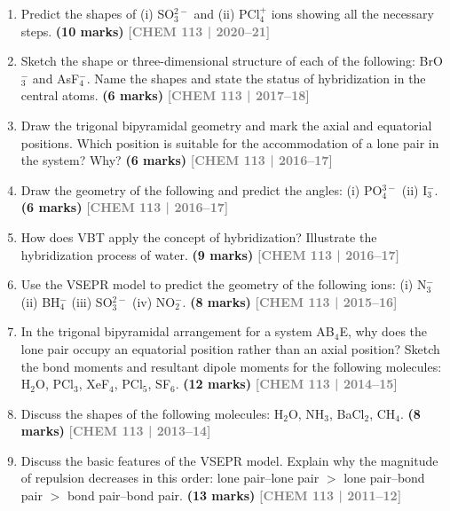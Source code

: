 \documentclass[12pt,a3paper]{article}
\newcommand{\yr}[1]{\hfill\textcolor{gray}{\small\textbf{[#1]}}}
\newcommand{\mk}[1]{\textcolor{orange!70!black}{\small\textbf{(#1 marks)}}}
\begin{document}
\begin{enumerate}
\item Predict the shapes of (i) SO$_3^{2-}$ and (ii) PCl$_4^+$ ions showing all the necessary steps. \mk{10}
\yr{CHEM 113 | 2020--21}



\item Sketch the shape or three-dimensional structure of each of the following: BrO$_3^-$ and AsF$_4^-$. Name the shapes and state the status of hybridization in the central atoms. \mk{6}
\yr{CHEM 113 | 2017--18}



\item Draw the trigonal bipyramidal geometry and mark the axial and equatorial positions. Which position is suitable for the accommodation of a lone pair in the system? Why? \mk{6}
\yr{CHEM 113 | 2016--17}



\item Draw the geometry of the following and predict the angles: (i) PO$_4^{3-}$ (ii) I$_3^-$. \mk{6}
\yr{CHEM 113 | 2016--17}



\item How does VBT apply the concept of hybridization? Illustrate the hybridization process of water. \mk{9}
\yr{CHEM 113 | 2016--17}



\item Use the VSEPR model to predict the geometry of the following ions: (i) N$_3^-$ (ii) BH$_4^-$ (iii) SO$_3^{2-}$ (iv) NO$_2^-$. \mk{8}
\yr{CHEM 113 | 2015--16}



\item In the trigonal bipyramidal arrangement for a system AB$_4$E, why does the lone pair occupy an equatorial position rather than an axial position? Sketch the bond moments and resultant dipole moments for the following molecules: H$_2$O, PCl$_3$, XeF$_4$, PCl$_5$, SF$_6$. \mk{12}
\yr{CHEM 113 | 2014--15}



\item Discuss the shapes of the following molecules: H$_2$O, NH$_3$, BaCl$_2$, CH$_4$. \mk{8}
\yr{CHEM 113 | 2013--14}



\item Discuss the basic features of the VSEPR model. Explain why the magnitude of repulsion decreases in this order: lone pair--lone pair $>$ lone pair--bond pair $>$ bond pair--bond pair. \mk{13}
\yr{CHEM 113 | 2011--12}




\end{enumerate}
\end{document}
